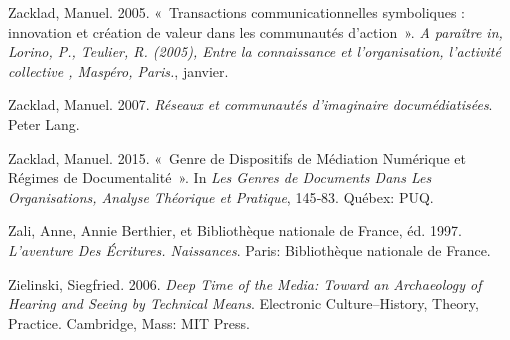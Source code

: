 \begin{CSLReferences}{1}{0}
\leavevmode{}%
Zacklad, Manuel. 2005. {«~{Transactions communicationnelles symboliques
: innovation et cr{é}ation de valeur dans les communaut{é}s
d'action}~»}. \emph{A para{î}tre in, Lorino, P., Teulier, R. (2005),
{\guillemotleft} Entre la connaissance et l'organisation, l'activit{é}
collective {\guillemotright}, Masp{é}ro, Paris.}, janvier.

\leavevmode{}%
Zacklad, Manuel. 2007. \emph{{R{é}seaux et communaut{é}s d'imaginaire
docum{é}diatis{é}es}}. {Peter Lang}.

\leavevmode{}%
Zacklad, Manuel. 2015. {«~Genre de Dispositifs de M{é}diation
Num{é}rique et R{é}gimes de Documentalit{é}~»}. In \emph{Les Genres de
Documents Dans Les Organisations, {Analyse} Th{é}orique et Pratique},
145‑83. {Qu{é}bex}: {PUQ}.

\leavevmode{}%
Zali, Anne, Annie Berthier, et Bibliothèque nationale de France, éd.
1997. \emph{L'aventure Des {É}critures. {Naissances}}. {Paris}:
{Biblioth{è}que nationale de France}.

\leavevmode{}%
Zielinski, Siegfried. 2006. \emph{Deep {Time} of the {Media}: {Toward}
an {Archaeology} of {Hearing} and {Seeing} by {Technical Means}}.
Electronic Culture--History, Theory, Practice. {Cambridge, Mass}: {MIT
Press}.

\end{CSLReferences}
